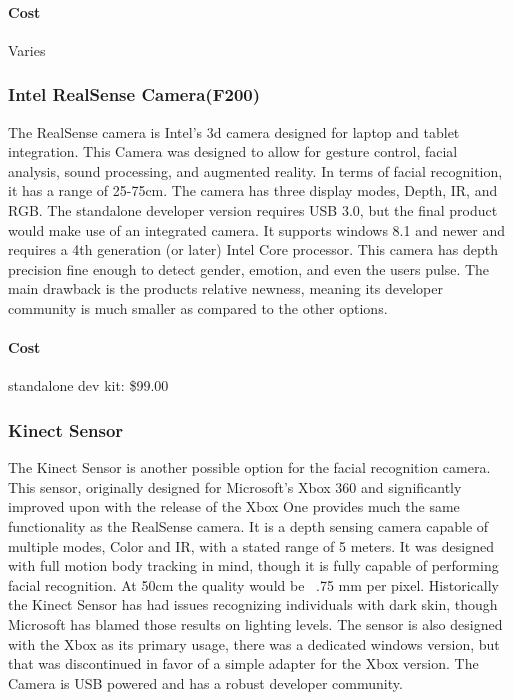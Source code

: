 \documentclass[10pt, onecolumn, twoside, peerreview]{IEEEtran}
\begin{document}
\paragraph{Cost} Varies\\

\subsubsection{Intel RealSense Camera(F200)}
The RealSense camera is Intel's 3d camera designed for laptop and tablet integration. This Camera was designed to allow
for gesture control, facial analysis, sound processing, and augmented reality. In terms of facial recognition, it has a
range of 25-75cm. The camera has three display modes, Depth, IR, and RGB. The standalone developer version requires USB
3.0, but the final product would make use of an integrated camera. It supports windows 8.1 and newer and requires a 4th
generation (or later) Intel Core processor. This camera has depth precision fine enough to detect gender, emotion, and
even the users pulse. The main drawback is the products relative newness, meaning its developer community is much
smaller as compared to the other options.
\paragraph{Cost} standalone dev kit: \$99.00\\

\subsubsection{Kinect Sensor}
The Kinect Sensor is another possible option for the facial recognition camera. This sensor, originally designed for
Microsoft's Xbox 360 and significantly improved upon with the release of the Xbox One provides much the same
functionality as the RealSense camera. It is a depth sensing camera capable of multiple modes, Color and IR, with a
stated range of 5 meters. It was designed with full motion body tracking in mind, though it is fully capable of
performing facial recognition. At 50cm the quality would be ~.75 mm per pixel. Historically the Kinect Sensor has had
issues recognizing individuals with dark skin, though Microsoft has blamed those results on lighting levels. The sensor
is also designed with the Xbox as its primary usage, there was a dedicated windows version, but that was discontinued
in favor of a simple adapter for the Xbox version. The Camera is USB powered and has a robust developer community.
\end{document}
